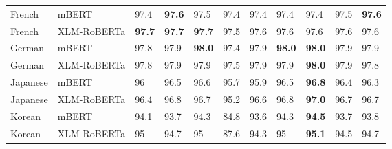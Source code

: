 \begin{tabular}{lllllrrllrl}
           French &          mBERT &          97.4 &   \textbf{97.6} &         97.5 &            97.4 &           97.4 &           97.4 &          97.4 &          97.5 &   \textbf{97.6} \\
           French &    XLM-RoBERTa &    \textbf{97.7} &   \textbf{97.7} &   \textbf{97.7} &            97.5 &           97.6 &           97.6 &          97.6 &          97.6 &         97.6 \\
           German &          mBERT &          97.8 &         97.9 &   \textbf{98.0} &            97.4 &           97.9 &     \textbf{98.0} &    \textbf{98.0} &          97.9 &         97.9 \\
           German &    XLM-RoBERTa &          97.8 &         97.9 &         97.9 &            97.5 &           97.9 &           97.9 &    \textbf{98.0} &          97.9 &         97.8 \\
         Japanese &          mBERT &            96 &         96.5 &         96.6 &            95.7 &           95.9 &           96.5 &    \textbf{96.8} &          96.4 &         96.3 \\
         Japanese &    XLM-RoBERTa &          96.4 &         96.8 &         96.7 &            95.2 &           96.6 &           96.8 &    \textbf{97.0} &          96.7 &         96.7 \\
           Korean &          mBERT &          94.1 &         93.7 &         94.3 &            84.8 &           93.6 &           94.3 &    \textbf{94.5} &          93.7 &         93.8 \\
           Korean &    XLM-RoBERTa &            95 &         94.7 &           95 &            87.6 &           94.3 &             95 &    \textbf{95.1} &          94.5 &         94.7 \\
\bottomrule
\end{tabular}
